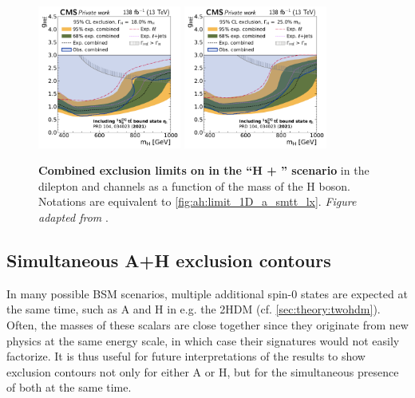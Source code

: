 \begin{figure}[!ph]
    \\
    \includegraphics[width=0.42\textwidth]{figures/ah/limits_combined/etat/H_limit_w18p0_g-scan.pdf}%
    \hspace*{0.05\textwidth}%
    \includegraphics[width=0.42\textwidth]{figures/ah/limits_combined/etat/H_limit_w25p0_g-scan.pdf}
    \caption{%
    \textbf{Combined exclusion limits on \gHtt in the ``H + \etat'' scenario} in the dilepton and \ljets channels as a function of the mass of the H boson. Notations are equivalent to \cref{fig:ah:limit_1D_a_smtt_lx}. \textit{Figure adapted from }.
    }
    \label{fig:ah:limit_1D_h_etat_lx}
\end{figure}

\subsection{Simultaneous A+H exclusion contours}

In many possible BSM scenarios, multiple additional spin-0 states are expected at the same time, such as A and H in e.g. the 2HDM (cf. \cref{sec:theory:twohdm}). Often, the masses of these scalars are close together since they originate from new physics at the same energy scale, in which case their signatures would not easily factorize. It is thus useful for future interpretations of the results to show exclusion contours not only for either A or H, but for the simultaneous presence of both at the same time.

